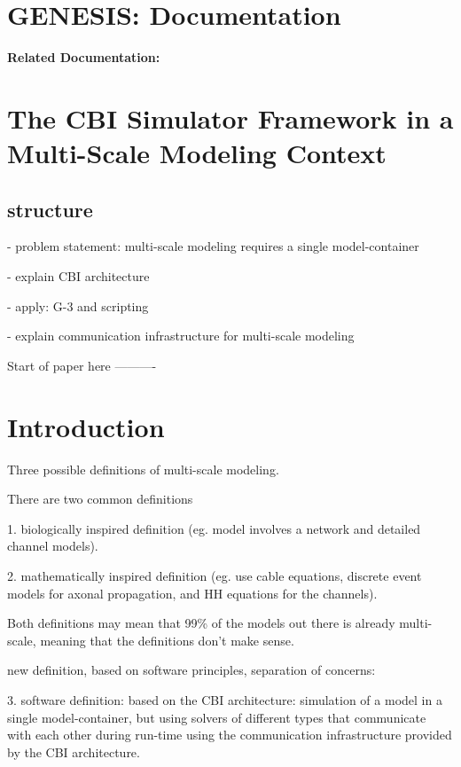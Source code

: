 \documentclass[12pt]{article}
\begin{document}
\section*{GENESIS: Documentation}

{\bf Related Documentation:}

\section*{The CBI Simulator Framework in a Multi-Scale Modeling Context}

\subsection*{structure}

- problem statement: multi-scale modeling requires a single model-container

- explain CBI architecture

- apply: G-3 and scripting

- explain communication infrastructure for multi-scale modeling


\vspace{1cm}

{\LARGE Start of paper here ----------}

\section*{Introduction}

Three possible definitions of multi-scale modeling.

There are two common definitions

1. biologically inspired definition (eg. model involves a network and
detailed channel models).

2. mathematically inspired definition (eg. use cable equations,
discrete event models for axonal propagation, and HH equations for the
channels).

Both definitions may mean that 99\% of the models out there is already
multi-scale, meaning that the definitions don't make sense.

new definition, based on software principles, separation of concerns:

3. software definition: based on the CBI architecture: simulation of a
model in a single model-container, but using solvers of different
types that communicate with each other during run-time using the
communication infrastructure provided by the CBI architecture.
\end{document}

